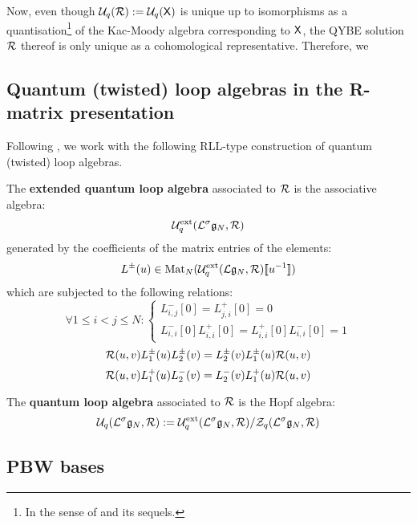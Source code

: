         Now, even though $\mathcal{U}_q(\mathcal{R}) := \mathcal{U}_q(\mathsf{X})$ is unique up to isomorphisms as a quantisation\footnote{In the sense of \cite{etingof_kazhdan_quantisation_1} and its sequels.} of the Kac-Moody algebra corresponding to $\mathsf{X}$, the QYBE solution $\mathcal{R}$ thereof is only unique as a cohomological representative. Therefore, we 

    \subsection{Quantum (twisted) loop algebras in the R-matrix presentation}
        Following \cite{guay_regelskis_wendlandt_R_matrix_presentation_of_quantum_loop_algebras}, we work with the following RLL-type construction of quantum (twisted) loop algebras.
        \begin{definition} \label{def: extended_quantum_loop_algebras}
            The \textbf{extended quantum loop algebra} associated to $\mathcal{R}$ is the associative algebra:
                $$\mathcal{U}_q^{\mathrm{ext}}(\mathcal{L}^{\sigma}\mathfrak{g}_N, \mathcal{R})$$
            generated by the coefficients of the matrix entries of the elements:
                $$L^{\pm}(u) \in \operatorname{Mat}_N( \mathcal{U}_q^{\mathrm{ext}}(\mathcal{L}\mathfrak{g}_N, \mathcal{R})[\![u^{-1}]\!] )$$
            which are subjected to the following relations:
                $$
                    \forall 1 \leq i < j \leq N:
                    \begin{cases}
                        L_{i, j}^-[0] = L_{j, i}^+[0] = 0
                        \\
                        L_{i, i}^-[0] L_{i, i}^+[0] = L_{i, i}^+[0] L_{i, i}^-[0] = 1
                    \end{cases}
                $$
                $$\mathcal{R}(u, v) L_1^{\pm}(u) L_2^{\pm}(v) = L_2^{\pm}(v) L_1^{\pm}(u) \mathcal{R}(u, v)$$
                $$\mathcal{R}(u, v) L_1^+(u) L_2^-(v) = L_2^-(v) L_1^+(u) \mathcal{R}(u, v)$$
        \end{definition}



        \begin{definition} \label{def: quantum_loop_algebras}
            The \textbf{quantum loop algebra} associated to $\mathcal{R}$ is the Hopf algebra:
                $$\mathcal{U}_q(\mathcal{L}^{\sigma}\mathfrak{g}_N, \mathcal{R}) := \mathcal{U}_q^{\mathrm{ext}}(\mathcal{L}^{\sigma}\mathfrak{g}_N, \mathcal{R})/\mathcal{Z}_q(\mathcal{L}^{\sigma}\mathfrak{g}_N, \mathcal{R})$$
        \end{definition}

    \subsection{PBW bases}